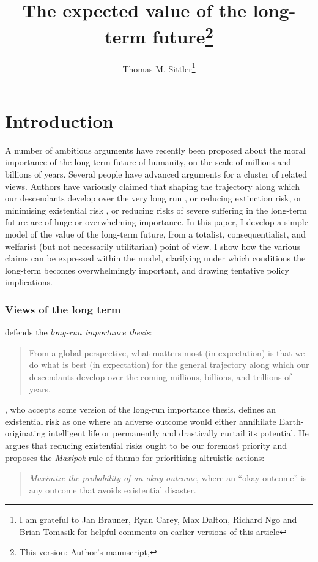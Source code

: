 \documentclass[british]{article}
\title{The expected value of the long-term future\footnote{This version: Author's manuscript, \DTMnow}}
\date{}
\author{Thomas M. Sittler\footnote{I am grateful to Jan Brauner, Ryan Carey, Max Dalton, Richard Ngo and Brian Tomasik for helpful comments on earlier versions of this article}}
\begin{document}
\maketitle

\section{Introduction}
A number of ambitious arguments have recently been proposed about the moral importance of the long-term future of humanity, on the scale of millions and billions of years. Several people have advanced arguments for a cluster of related views. Authors have variously claimed that shaping the trajectory along which our descendants develop over the very long run \citep{beckstead_overwhelming_2013-2}, or reducing extinction risk, or minimising existential risk \citep{bostrom_existential_2002}, or reducing risks of severe suffering in the long-term future \citep{althaus_reducing_2016} are of huge or overwhelming importance. In this paper, I develop a simple model of the value of the long-term future, from a totalist, consequentialist, and welfarist (but not necessarily utilitarian) point of view. I show how the various claims can be expressed within the model, clarifying under which conditions the long-term becomes overwhelmingly important, and drawing tentative policy implications. 

\subsubsection*{Views of the long term}\label{claims}
\cite{beckstead_overwhelming_2013-2} defends the \emph{long-run importance thesis}:
\begin{quote}
From a global perspective, what matters most (in
expectation) is that we do what is best (in expectation) for the general
trajectory along which our descendants develop over the coming millions,
billions, and trillions of years.
\end{quote}

\cite{bostrom_existential_2002}, who accepts some version of the long-run importance thesis, defines an existential risk as one where an adverse outcome would either annihilate Earth-originating
intelligent life or permanently and drastically curtail its potential. He argues that reducing existential risks ought to be our foremost priority and proposes the \emph{Maxipok} rule of thumb for prioritising altruistic actions: 
\begin{quote}
\emph{Maximize the probability of an okay outcome}, where an ``okay
outcome'' is any outcome that avoids existential disaster.
\end{quote}
\end{document}
